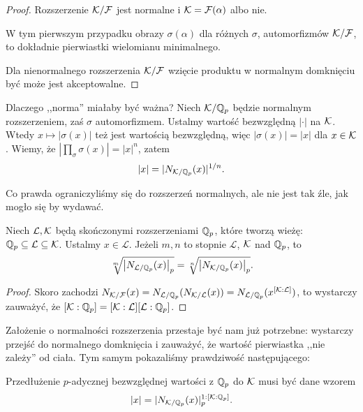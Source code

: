 \begin{proof}
	Rozszerzenie $\mathcal K / \mathcal F$ jest normalne i $\mathcal K = \mathcal F(\alpha)$ albo nie.
	
	W tym pierwszym przypadku obrazy $\sigma(\alpha)$ dla różnych $\sigma$, automorfizmów $\mathcal K/ \mathcal F$, to dokładnie pierwiastki wielomianu minimalnego.
	
	Dla nienormalnego rozszerzenia $\mathcal K / \mathcal F$ wzięcie produktu w normalnym domknięciu być może jest akceptowalne. 
\end{proof}

Dlaczego ,,norma'' miałaby być ważna?
Niech $\mathcal K / \mathbb Q_p$ będzie normalnym rozszerzeniem, zaś $\sigma$ automorfizmem.
Ustalmy wartość bezwzględną $|\cdot|$ na $\mathcal K$.
Wtedy $x \mapsto |\sigma(x)|$ też jest wartością bezwzględną, więc $|\sigma(x)| = |x|$ dla $x \in \mathcal K$.
Wiemy, że $|\prod_\sigma \sigma(x)| = |x|^n$, zatem
\[
	|x| = |N_{\mathcal K / \mathbb Q_p}(x)|^{1/n}.
\]

Co prawda ograniczyliśmy się do rozszerzeń normalnych, ale nie jest tak źle, jak mogło się by wydawać.

\begin{lemat}
	Niech $\mathcal L, \mathcal K$ będą skończonymi rozszerzeniami $\mathbb Q_p$, które tworzą wieżę: $\mathbb Q_p \subseteq \mathcal L \subseteq \mathcal K$.
	Ustalmy $x \in \mathcal L$.
	Jeżeli $m, n$ to stopnie $\mathcal L$, $\mathcal K$ nad $\mathbb Q_p$, to
	\[
		\sqrt[m]{\left|N_{\mathcal L / \mathbb Q_p} (x) \right|_p} = \sqrt[n]{\left|N_{\mathcal K / \mathbb Q_p} (x) \right|_p}.
	\]
\end{lemat}

\begin{proof}
	Skoro zachodzi $N_{\mathcal K/\mathcal F}(x) = N_{\mathcal L/\mathbb Q_p} (N_{\mathcal K/\mathcal L}(x)) = N_{\mathcal L/\mathbb Q_p} (x^{[\mathcal K: \mathcal L]})$, to wystarczy zauważyć, że $[\mathcal K:\mathbb Q_p] = [\mathcal K  :\mathcal L][\mathcal L : \mathbb Q_p]$.
\end{proof}

Założenie o normalności rozszerzenia przestaje być nam już potrzebne: wystarczy przejść do normalnego domknięcia i zauważyć, że wartość pierwiastka ,,nie zależy'' od ciała.
Tym samym pokazaliśmy prawdziwość następującego:

\begin{fakt}
	Przedłużenie $p$-adycznej bezwzględnej wartości z $\mathbb Q_p$ do $\mathcal K$ musi być dane wzorem
	\[
		|x| = |N_{\mathcal K/ \mathbb Q_p}(x)|_p^{1 : [\mathcal K : \mathbb Q_p]}.
	\]
\end{fakt}


